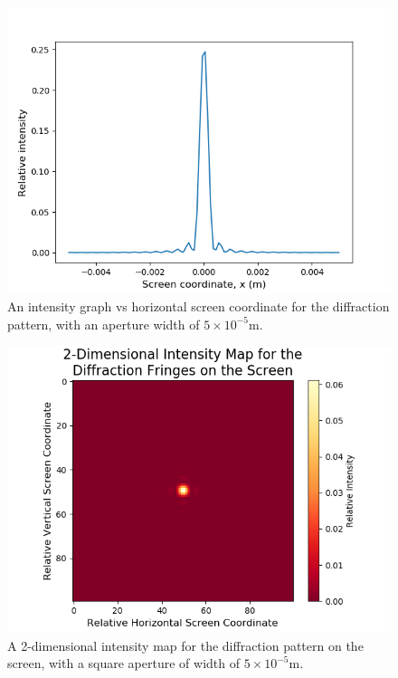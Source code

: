 \documentclass[twocolumn,prl,nobalancelastpage,aps,10pt]{revtex4-1}
\begin{document}
\begin{figure}[!ht]
	\includegraphics*[width=0.96\linewidth,clip]{1D_WIDTH5E-5}
	\caption{An intensity graph vs horizontal screen coordinate for the diffraction pattern, with an aperture width of $5\times10^{-5}$m.} \label{1D_WIDTH5E-5}
\end{figure}

\begin{figure}
	\includegraphics*[width=0.96\linewidth,clip]{2D_WIDTH5E-5}
	\caption{A 2-dimensional intensity map for the diffraction pattern on the screen, with a square aperture of width of $5\times10^{-5}$m.} \label{2D_WIDTH5E-5}
\end{figure}
\end{document}
